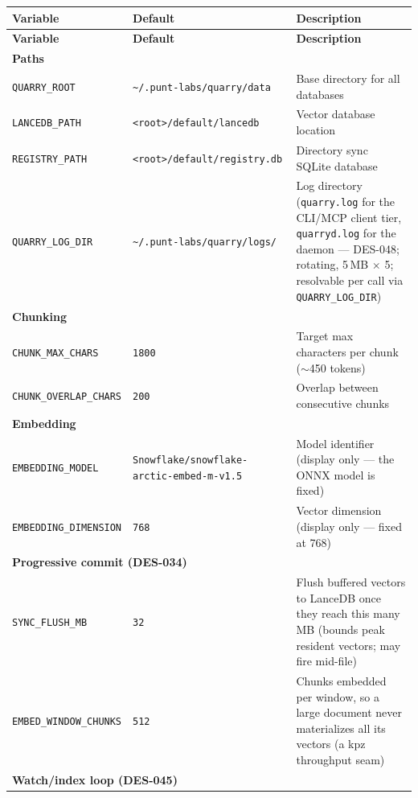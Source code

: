 \documentclass[a4paper,10pt]{article}
\begin{document}
\begin{center}
\small
\setlength{\tabcolsep}{4pt}
\begin{longtable}{llp{6.5cm}}
\toprule
\textbf{Variable} & \textbf{Default} & \textbf{Description} \\
\midrule
\endfirsthead
\toprule
\textbf{Variable} & \textbf{Default} & \textbf{Description} \\
\midrule
\endhead
\multicolumn{3}{l}{\textbf{Paths}} \\
\midrule
\texttt{QUARRY\_ROOT}    & \texttt{\~{}/.punt-labs/quarry/data} &
  Base directory for all databases \\
\texttt{LANCEDB\_PATH}   & \texttt{<root>/default/lancedb} &
  Vector database location \\
\texttt{REGISTRY\_PATH}  & \texttt{<root>/default/registry.db} &
  Directory sync SQLite database \\
\texttt{QUARRY\_LOG\_DIR} & \texttt{\~{}/.punt-labs/quarry/logs/} &
  Log directory (\texttt{quarry.log} for the CLI/MCP client tier,
  \texttt{quarryd.log} for the daemon --- DES-048; rotating, 5\,MB
  $\times$ 5; resolvable per call via \texttt{QUARRY\_LOG\_DIR}) \\
\midrule
\multicolumn{3}{l}{\textbf{Chunking}} \\
\midrule
\texttt{CHUNK\_MAX\_CHARS}     & \texttt{1800} &
  Target max characters per chunk ($\sim$450 tokens) \\
\texttt{CHUNK\_OVERLAP\_CHARS} & \texttt{200} &
  Overlap between consecutive chunks \\
\midrule
\multicolumn{3}{l}{\textbf{Embedding}} \\
\midrule
\texttt{EMBEDDING\_MODEL}     & \texttt{Snowflake/\allowbreak snowflake-arctic-embed-m-v1.5} &
  Model identifier (display only --- the ONNX model is fixed) \\
\texttt{EMBEDDING\_DIMENSION} & \texttt{768} &
  Vector dimension (display only --- fixed at 768) \\
\midrule
\multicolumn{3}{l}{\textbf{Progressive commit (DES-034)}} \\
\midrule
\texttt{SYNC\_FLUSH\_MB}       & \texttt{32} &
  Flush buffered vectors to LanceDB once they reach this many MB
  (bounds peak resident vectors; may fire mid-file) \\
\texttt{EMBED\_WINDOW\_CHUNKS} & \texttt{512} &
  Chunks embedded per window, so a large document never materializes
  all its vectors (a kpz throughput seam) \\
\midrule
\multicolumn{3}{l}{\textbf{Watch/index loop (DES-045)}} \\

\end{longtable}
\end{center}
\end{document}
